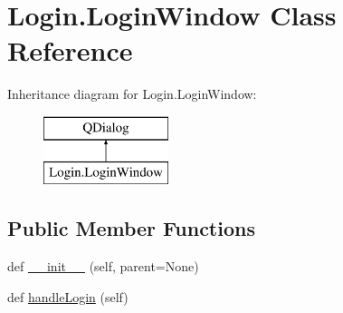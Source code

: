 \hypertarget{classLogin_1_1LoginWindow}{}\section{Login.\+Login\+Window Class Reference}
\label{classLogin_1_1LoginWindow}
Inheritance diagram for Login.\+Login\+Window\+:\begin{figure}[H]
\begin{center}
\leavevmode
\includegraphics[height=2.000000cm]{classLogin_1_1LoginWindow}
\end{center}
\end{figure}
\subsection*{Public Member Functions}
\begin{DoxyCompactItemize}
\item 
def \hyperlink{classLogin_1_1LoginWindow_aef57c8863324399070faf514e2883e66}{\+\_\+\+\_\+init\+\_\+\+\_\+} (self, parent=None)
\item 
def \hyperlink{classLogin_1_1LoginWindow_a391e97589387c5760c2d62f29b8ff1d3}{handle\+Login} (self)
\end{DoxyCompactItemize}
